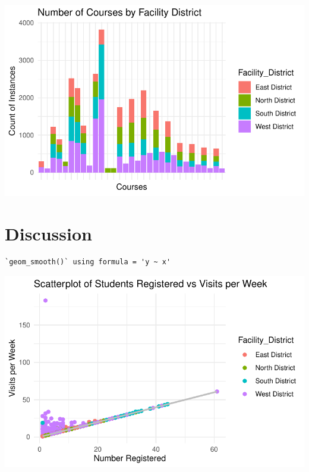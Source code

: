 \documentclass[
  letterpaper,
  DIV=11,
  numbers=noendperiod]{scrartcl}
\begin{document}
\includegraphics{paper_files/figure-pdf/unnamed-chunk-3-1.pdf}

\section{Discussion}\label{discussion}

\begin{verbatim}
`geom_smooth()` using formula = 'y ~ x'
\end{verbatim}

\includegraphics{paper_files/figure-pdf/unnamed-chunk-4-1.pdf}
\end{document}
